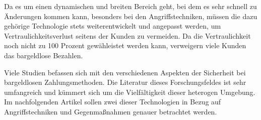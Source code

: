 

Da es um einen dynamischen und breiten Bereich geht, bei dem es sehr schnell zu Änderungen kommen kann, 
besonders bei den Angriffstechniken, müssen die dazu gehörige \cite{refip:NYRS} Technologie stets 
weiterentwickelt und angepasst werden, um Vertraulichkeitsverlust seitens der Kunden zu vermeiden. 
Da die Vertraulichkeit noch nicht zu 100 Prozent gewähleistet werden kann, verweigern viele Kunden
das bargeldlose Bezahlen.

Viele Studien befassen sich mit den verschiedenen Aspekten der Sicherheit bei bargeldlosen Zahlungsmethoden.
Die Literatur dieses Forschungsfeldes ist sehr umfangreich und kümmert sich um die Vielfältigkeit 
dieser heterogen \cite{refip:GMPS} Umgebung. Im nachfolgenden Artikel sollen zwei dieser Technologien 
in Bezug auf Angriffstechniken und Gegenmaßnahmen genauer betrachtet werden.




